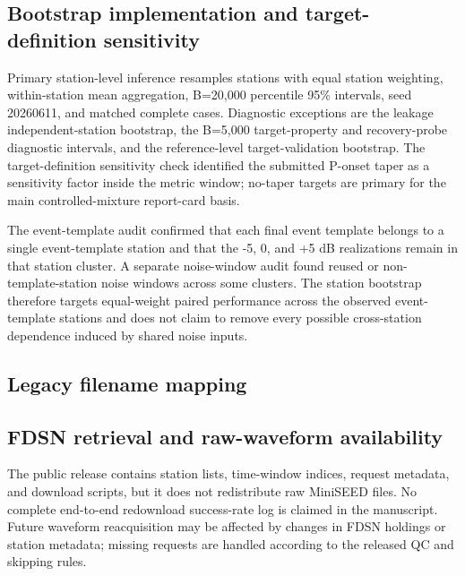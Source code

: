 \documentclass[12pt]{article}
\begin{document}
\subsection*{Bootstrap implementation and target-definition sensitivity}
Primary station-level inference resamples stations with equal station weighting, within-station mean aggregation, B=20,000 percentile 95\% intervals, seed 20260611, and matched complete cases. Diagnostic exceptions are the leakage independent-station bootstrap, the B=5,000 target-property and recovery-probe diagnostic intervals, and the reference-level target-validation bootstrap. The target-definition sensitivity check identified the submitted P-onset taper as a sensitivity factor inside the metric window; no-taper targets are primary for the main controlled-mixture report-card basis.

The event-template audit confirmed that each final event template belongs to a single event-template station and that the -5, 0, and +5 dB realizations remain in that station cluster. A separate noise-window audit found reused or non-template-station noise windows across some clusters. The station bootstrap therefore targets equal-weight paired performance across the observed event-template stations and does not claim to remove every possible cross-station dependence induced by shared noise inputs.

\subsection*{Legacy filename mapping}
\resizebox{\linewidth}{!}{}

\subsection*{FDSN retrieval and raw-waveform availability}
The public release contains station lists, time-window indices, request metadata, and download scripts, but it does not redistribute raw MiniSEED files. No complete end-to-end redownload success-rate log is claimed in the manuscript. Future waveform reacquisition may be affected by changes in FDSN holdings or station metadata; missing requests are handled according to the released QC and skipping rules.
\end{document}
